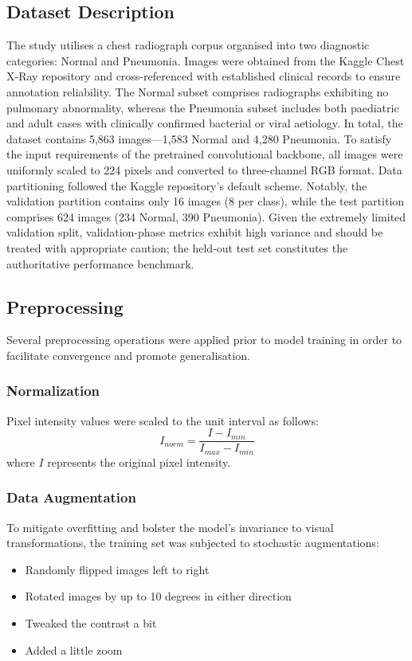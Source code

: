 \documentclass[conference]{IEEEtran}
\begin{document}
\subsection{\textbf{Dataset Description}}
The study utilises a chest radiograph corpus organised into two diagnostic categories: Normal and Pneumonia. Images were obtained from the Kaggle Chest X-Ray repository and cross-referenced with established clinical records to ensure annotation reliability. The Normal subset comprises radiographs exhibiting no pulmonary abnormality, whereas the Pneumonia subset includes both paediatric and adult cases with clinically confirmed bacterial or viral aetiology. In total, the dataset contains 5,863 images—1,583 Normal and 4,280 Pneumonia.
To satisfy the input requirements of the pretrained convolutional backbone, all images were uniformly scaled to 224 pixels and converted to three-channel RGB format. Data partitioning followed the Kaggle repository's default scheme. Notably, the validation partition contains only 16 images (8 per class), while the test partition comprises 624 images (234 Normal, 390 Pneumonia). Given the extremely limited validation split, validation-phase metrics exhibit high variance and should be treated with appropriate caution; the held-out test set constitutes the authoritative performance benchmark.


\subsection{\textbf{Preprocessing}}
Several preprocessing operations were applied prior to model training in order to facilitate convergence and promote generalisation.
\subsubsection{Normalization}
Pixel intensity values were scaled to the unit interval as follows:
\begin{equation}
I_{norm} = \frac{I - I_{min}}{I_{max} - I_{min}}
\end{equation}
where \( I \) represents the original pixel intensity.
\subsubsection{Data Augmentation}
To mitigate overfitting and bolster the model's invariance to visual transformations, the training set was subjected to stochastic augmentations:
\begin{itemize}
    \item Randomly flipped images left to right
    \item Rotated images by up to 10 degrees in either direction
    \item Tweaked the contrast a bit
    \item Added a little zoom
\end{itemize}
\end{document}
